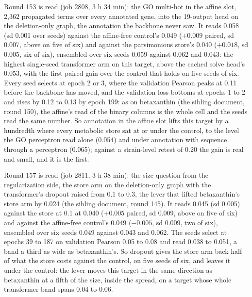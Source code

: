 Round 153 is read (job 2808, 3 h 34 min): the GO multi-hot in the affine slot, 2,362
propagated terms over every annotated gene, into the 19-output head on the
deletion-only graph, the annotation the backbone never saw. It reads 0.058 (sd 0.001
over seeds) against the affine-free control's 0.049 ($+0.009$ paired, sd 0.007, above
on five of six) and against the parsimonious store's 0.040 ($+0.018$, sd 0.005, six of
six), ensembled over six seeds 0.059 against 0.062 and 0.043: the highest single-seed
transformer arm on this target, above the cached solve head's 0.053, with the first
paired gain over the control that holds on five seeds of six. Every seed selects at
epoch 2 or 3, where the validation Pearson peaks at 0.11 before the backbone has moved,
and the validation loss bottoms at epochs 1 to 2 and rises by 0.12 to 0.13 by epoch
199: as on betaxanthin (the sibling document, round 150), the affine's read of the
binary columns is the whole cell and the seeds read the same number. So annotation in
the affine slot lifts this target by a hundredth where every metabolic store sat at or
under the control, to the level the GO perceptron read alone (0.054) and under
annotation with sequence through a perceptron (0.065); against a strain-level retest
of 0.20 the gain is real and small, and it is the first.

Round 157 is read (job 2811, 3 h 38 min): the size question from the regularization
side, the store arm on the deletion-only graph with the transformer's dropout raised
from 0.1 to 0.3, the lever that lifted betaxanthin's store arm by 0.024 (the sibling
document, round 145). It reads 0.045 (sd 0.005) against the store at 0.1 at 0.040
($+0.005$ paired, sd 0.009, above on five of six) and against the affine-free control's
0.049 ($-0.005$, sd 0.009, two of six), ensembled over six seeds 0.049 against 0.043
and 0.062. The seeds select at epochs 39 to 187 on validation Pearson 0.05 to 0.08 and
read 0.038 to 0.051, a band a third as wide as betaxanthin's. So dropout gives the
store arm back half of what the store costs against the control, on five seeds of six,
and leaves it under the control: the lever moves this target in the same direction as
betaxanthin at a fifth of the size, inside the spread, on a target whose whole
transformer band spans 0.04 to 0.06.

